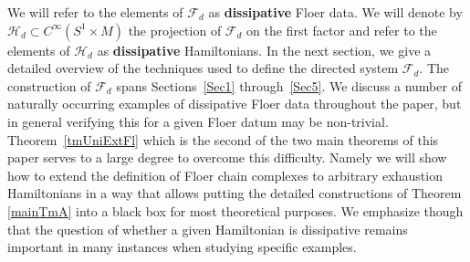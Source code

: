 \documentclass[11pt]{amsart}
\theoremstyle{definition}
\theoremstyle{remark}
\begin{document}
We will refer to the elements of $\mathcal{F}_d$ as \textbf{dissipative} Floer data. We will denote by $\mathcal{H}_d\subset C^{\infty}(S^1\times M)$ the projection of $\mathcal{F}_d$ on the first factor and refer to the elements of $\mathcal{H}_d$ as \textbf{dissipative} Hamiltonians. In the next section, we give a detailed overview of the techniques used to define the directed system $\mathcal{F}_d$. The construction of $\mathcal{F}_d$ spans Sections~\ref{Sec1} through~\ref{Sec5}. We discuss a number of naturally occurring examples of dissipative Floer data throughout the paper, but in general verifying this for a given Floer datum may be non-trivial. Theorem~\ref{tmUniExtFl} which is the second of the two main theorems of this paper serves to a large degree to overcome this difficulty. Namely we will show how to extend the definition of Floer chain complexes to arbitrary exhaustion Hamiltonians in a way that allows putting the detailed constructions of Theorem \ref{mainTmA} into a black box for most theoretical purposes. We emphasize though that the question of whether a given Hamiltonian is dissipative remains important in many instances when studying specific examples.
\end{document}
